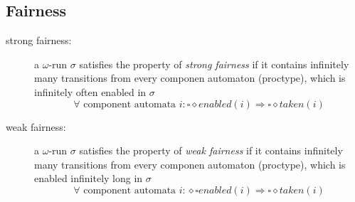 \documentclass[a4paper, 10pt]{article}
\begin{document}
\subsection*{Fairness}
\begin{description}
    \item[strong fairness:] a $\omega$-run $\sigma$ satisfies the property of \emph{strong fairness} if it contains infinitely many transitions from every componen automaton (proctype), which is infinitely often enabled in $\sigma$
    \[\forall \textrm{ component automata } i:\square\diamond enabled(i)\Rightarrow\square\diamond taken(i) \]
    \item[weak fairness:] a $\omega$-run $\sigma$ satisfies the property of \emph{weak fairness} if it contains infinitely many transitions from every componen automaton (proctype), which is enabled infinitely long in $\sigma$
    \[ \forall \textrm{ component automata } i:\diamond\square enabled(i)\Rightarrow \square\diamond taken(i) \]
\end{description}
\end{document}

